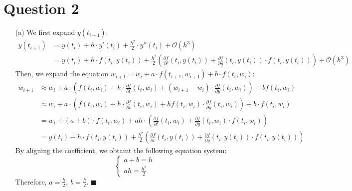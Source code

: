 \documentclass[11pt]{article}
\begin{document}
\section*{Question 2}
\begin{itemize}
	\item [(a)]
	We first expand $ y(t_{i+1}) $:
	\begin{align*}
	y(t_{i+1}) &= y(t_i) + h\cdot y'(t_i) + \frac{h^2}{2}\cdot y''(t_i) + \mathcal{O}(h^3)\\
	&= y(t_i) + h\cdot f(t_i,y(t_i)) + \frac{h^2}{2}\left(\frac{\partial f}{\partial t}(t_i, y(t_i)) + \frac{\partial f}{\partial y}(t_i,y(t_i))\cdot f(t_i, y(t_i))\right)+ \mathcal{O}(h^3)
	\end{align*}
	Then, we expand the equation $ w_{i+1} = w_i + a\cdot f(t_{i+1},w_{i+1}) + b\cdot f(t_i,w_i) $:
	\begin{align*}
	w_{i+1} &\approx w_i + a\cdot \left(f(t_{i},w_{i}) + h\cdot \frac{\partial f}{\partial t}(t_i, w_i) + (w_{i+1}-w_i)\cdot \frac{\partial f}{\partial y}(t_i,w_i) \right) + bf(t_i,w_i)\\
	&\approx w_i + a\cdot \left( f(t_{i},w_{i}) + h\cdot \frac{\partial f}{\partial t}(t_i, w_i) + hf(t_i,w_i)\cdot \frac{\partial f}{\partial y}(t_i,w_i)  \right) + b\cdot f(t_i,w_i)\\
	&=w_i + (a+b)\cdot f(t_i,w_i) + ah\cdot \left(\frac{\partial f}{\partial t}(t_i, w_i) + \frac{\partial f}{\partial y}(t_i,w_i)\cdot f(t_i,w_i) \right)\\
	&=y(t_i) + h\cdot f(t_i,y(t_i)) + \frac{h^2}{2}\left(\frac{\partial f}{\partial t}(t_i, y(t_i)) + \frac{\partial f}{\partial y}(t_i,y(t_i))\cdot f(t_i, y(t_i))\right)
	\end{align*}
	By aligning the coefficient, we obtaint the following equation system:
	\[ \begin{cases}
	a+b = h\\
	ah = \frac{h^2}{2}
	\end{cases} \]
	Therefore, $\boxed{ a = \frac{h}{2},\ b = \frac{h}{2} }$. \hfill $ \blacksquare $
	

\end{itemize}
\end{document}
